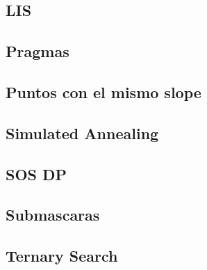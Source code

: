 \subsection{	LIS}
\raggedbottom
\hrulefill
\subsection{	Pragmas}
\raggedbottom
\hrulefill
\subsection{	Puntos con el mismo slope}
\raggedbottom
\hrulefill
\subsection{	Simulated Annealing}
\raggedbottom
\hrulefill
\subsection{	SOS DP}
\raggedbottom
\hrulefill
\subsection{	Submascaras}
\raggedbottom
\hrulefill
\subsection{	Ternary Search}
\raggedbottom
\hrulefill


